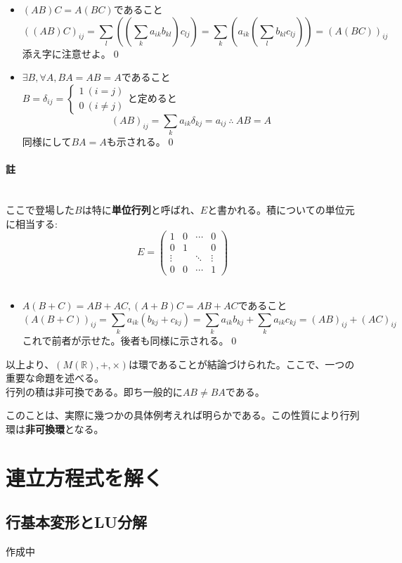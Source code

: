 \documentclass[dvipdfmx]{jsarticle}
\begin{document}
\begin{itemize}
\item $(AB)C=A(BC)$であること
\[((AB)C)_{ij}=\sum_l((\sum_ka_{ik}b_{kl})c_{lj})=\sum_k(a_{ik}(\sum_lb_{kl}c_{lj}))=(A(BC))_{ij}\]
添え字に注意せよ。\qed
\item $\exists B,\forall A,BA=AB=A$であること\\
$B=\delta_{ij}=\begin{cases}1~(i=j) \\ 0~(i \neq j)\end{cases}$と定めると
\[(AB)_{ij}=\sum_ka_{ik}\delta_{kj}=a_{ij}~\therefore~AB=A\]
同様にして$BA=A$も示される。\qed\par
\end{itemize}
\paragraph{註}~\\
ここで登場した$B$は特に\textbf{単位行列}と呼ばれ、$E$と書かれる。積についての単位元に相当する:
\[E=\begin{pmatrix}1&0&\cdots&0\\0&1&{}&0\\\vdots&{}&\ddots&\vdots\\0&0&\cdots&1\end{pmatrix}\]\\
\begin{itemize}
\item $A(B+C)=AB+AC,(A+B)C=AB+AC$であること
\[(A(B+C))_{ij}=\sum_ka_{ik}(b_{kj}+c_{kj})=\sum_ka_{ik}b_{kj}+\sum_ka_{ik}c_{kj}=(AB)_{ij}+(AC)_{ij}\]
これで前者が示せた。後者も同様に示される。\qed
\end{itemize}
以上より、$(M(\mathbb{R}),+,\times)$は環であることが結論づけられた。ここで、一つの重要な命題を述べる。\\
行列の積は非可換である。即ち一般的に$AB \neq BA$である。\\\par
このことは、実際に幾つかの具体例考えれば明らかである。この性質により行列環は\textbf{非可換環}となる。


\section{連立方程式を解く}

\subsection{行基本変形とLU分解}
作成中
\end{document}
